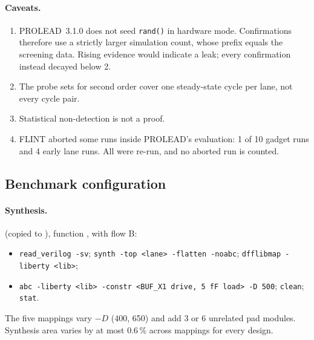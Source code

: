 \paragraph{Caveats.}
\begin{enumerate}
  \item PROLEAD~3.1.0 does not seed \texttt{rand()} in hardware mode. Confirmations therefore use a strictly larger simulation count, whose prefix equals the screening data. Rising evidence would indicate a leak; every confirmation instead decayed below 2.
  \item The probe sets for second order cover one steady-state cycle per lane, not every cycle pair.
  \item Statistical non-detection is not a proof.
  \item FLINT aborted some runs inside PROLEAD's evaluation: 1 of 10 gadget runs and 4 early lane runs. All were re-run, and no aborted run is counted.
\end{enumerate}

\subsection{Benchmark configuration}\label{app:config}
\paragraph{Synthesis.}  (copied to ), function , with flow B:
\begin{itemize}
  \item \texttt{read\_verilog -sv}; \texttt{synth -top <lane> -flatten -noabc}; \texttt{dfflibmap -liberty <lib>};
  \item \texttt{abc -liberty <lib> -constr <BUF\_X1 drive, 5 fF load> -D 500}; \texttt{clean}; \texttt{stat}.
\end{itemize}
The five mappings vary $-D$ (400, 650) and add 3 or 6 unrelated pad modules. Synthesis area varies by at most 0.6\,\% across mappings for every design.

